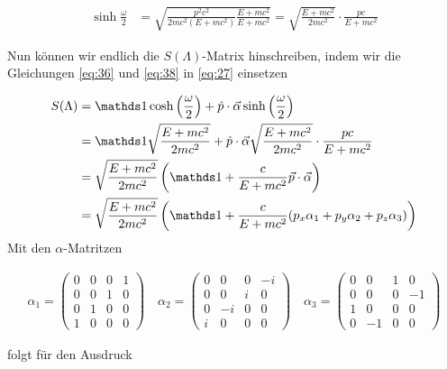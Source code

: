 \begin{align}
  \label{eq:38}
   \sinh\frac{\omega}{2} &=  \sqrt{\frac{p^2c^2}{2mc^2(E+mc^2)} \frac{E+mc^2}{E+mc^2} } = \sqrt{\frac{E+mc^2}{2mc^2}}\cdot \frac{pc}{E+mc^2}
\end{align}

Nun können wir endlich die \(S(\Lambda)\)-Matrix hinschreiben, indem wir die Gleichungen \eqref{eq:36} und \eqref{eq:38} in \eqref{eq:27} einsetzen

\begin{align}
  \label{eq:39}
   S(\Lambda) &= \mathds 1 \cosh\left(\frac{\omega}{2}\right) + \hat p\cdot\vec \alpha \sinh\left(\frac{\omega}{2} \right) \notag \\
&= \mathds 1 \sqrt{\frac{E + mc^2}{2mc^2}} +  \hat p\cdot\vec \alpha \sqrt{\frac{E+mc^2}{2mc^2}}\cdot \frac{pc}{E+mc^2} \notag \\
&=  \sqrt{\frac{E + mc^2}{2mc^2}}\left(\mathds 1 +  \frac{c}{E+mc^2}\vec p\cdot\vec\alpha\right)  \notag \\
&=  \sqrt{\frac{E + mc^2}{2mc^2}}\left(\mathds 1 +  \frac{c}{E+mc^2}( p_x\alpha_1+p_y\alpha_2+p_z\alpha_3) \right)  \notag \\
\end{align}
Mit den \(\alpha\)-Matritzen

\begin{align}
  \label{eq:40}
  \alpha_1 = \begin{pmatrix}
   0&0&0&1\\
   0&0&1&0\\
 0&1&0&0\\
 1&0&0&0
  \end{pmatrix}\quad
 \alpha_2 = \begin{pmatrix}
   0&0&0&-i\\
   0&0&i&0\\
 0&-i&0&0\\
 i&0&0&0
  \end{pmatrix}\quad
 \alpha_3 = \begin{pmatrix}
   0&0&1&0\\
   0&0&0&-1\\
 1&0&0&0\\
 0&-1&0&0
  \end{pmatrix}
\end{align}

folgt für den Ausdruck

